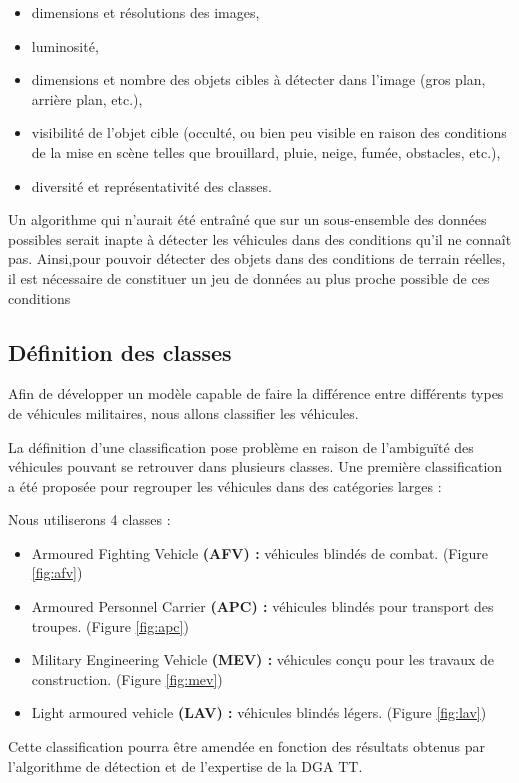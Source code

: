 \begin{itemize}
    \item dimensions et résolutions des images,
    \item luminosité,
    \item dimensions et nombre des objets cibles à détecter dans l’image (gros plan, arrière plan, etc.),
    \item visibilité de l’objet cible (occulté, ou bien peu visible en raison des conditions de la mise en scène telles que brouillard, pluie, neige, fumée, obstacles, etc.),
    \item diversité et représentativité des classes.
\end{itemize}

Un algorithme qui n’aurait été entraîné que sur un sous-ensemble des données possibles serait inapte à détecter les véhicules dans des conditions qu’il ne connaît pas.
Ainsi,pour pouvoir détecter des objets dans des conditions de terrain réelles, il est nécessaire de constituer un jeu de données au plus proche possible de ces conditions



\subsection{Définition des classes}

Afin de développer un modèle capable de faire la différence entre différents types de véhicules militaires, nous allons classifier les véhicules.

La définition d’une classification pose problème en raison de l’ambiguïté des véhicules pouvant se retrouver dans plusieurs classes.
Une première classification a été proposée pour regrouper les véhicules dans des catégories larges :

Nous utiliserons 4 classes :

\begin{itemize}
    \item Armoured Fighting Vehicle \textbf{(AFV) :} véhicules blindés de combat. (Figure \ref{fig:afv})
    \item Armoured Personnel Carrier \textbf{(APC) :} véhicules blindés pour transport des troupes. (Figure \ref{fig:apc})
    \item Military Engineering Vehicle \textbf{(MEV) :} véhicules conçu pour les travaux de construction. (Figure \ref{fig:mev})
    \item Light armoured vehicle \textbf{(LAV) :} véhicules blindés légers. (Figure \ref{fig:lav})
\end{itemize}
Cette classification pourra être amendée en fonction des résultats obtenus par l’algorithme de détection et de l’expertise de la DGA TT.


